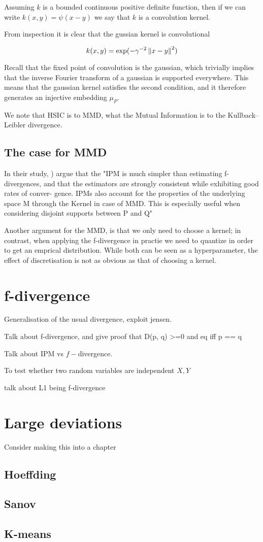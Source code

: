 Assuming $k$ is a bounded continuous positive definite function, then if we can write
$k(x, y) = \psi (x - y)$ we say that $k$ is a convolution kernel.

From inspection it is clear that the gussian kernel is convolutional

$$
    k(x, y) = \exp (-\gamma^{-2}\left\lVert x - y\right\rVert^2)
$$

Recall that the fixed point of convolution is the gaussian, which trivially implies
that the inverse Fourier transform of a gaussian is supported everywhere. 
 This means that the gaussian kernel satisfies the second
condition, and it therefore generates an injective embedding $\mu_P$.

We note that HSIC is to MMD, what the Mutual Information is to the Kullback–Leibler divergence.

\subsection{The case for MMD}

In their study, \cite{sriperumbudur2009integral}) argue that the "IPM is much
simpler than estimating f-divergences, and that the estimators
are strongly consistent while exhibiting good rates of conver-
gence. IPMs also account for the properties of
the underlying space M through the Kernel in case of MMD. This is especially
useful when considering disjoint supports between P and Q"

Another argument for the MMD, is that we only need to choose a kernel; in contrast, 
when applying the f-divergence in practie we need to quantize in order to get an 
emprical distribution. While both can be seen as a hyperparameter, the effect of 
discretisation is not as obvious as that of choosing a kernel. 

\section{f-divergence}

Generalisation of the usual divergence, exploit jensen.

Talk about f-divergence, and give proof that D(p, q) >=0 and eq iff p == q

Talk about IPM vs $f-$divergence. 

To test whether two random variables are independent $X, Y$

talk about L1 being f-divergence


\section{Large deviations}

Consider making this into a chapter

\subsection{Hoeffding}

\subsection{Sanov}

\subsection{K-means}





